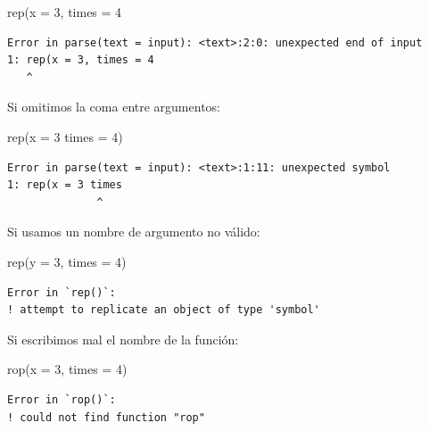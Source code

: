 \documentclass[
  spanish,
  letterpaper,
  DIV=11,
  numbers=noendperiod]{scrreprt}
\newenvironment{Shaded}{\begin{snugshade}}{\end{snugshade}}
\newcommand{\AttributeTok}[1]{\textcolor[rgb]{0.40,0.45,0.13}{#1}}
\newcommand{\DecValTok}[1]{\textcolor[rgb]{0.68,0.00,0.00}{#1}}
\newcommand{\FunctionTok}[1]{\textcolor[rgb]{0.28,0.35,0.67}{#1}}
\newcommand{\NormalTok}[1]{\textcolor[rgb]{0.00,0.23,0.31}{#1}}
\begin{document}
\begin{Shaded}
\begin{Highlighting}[]
\FunctionTok{rep}\NormalTok{(}\AttributeTok{x =} \DecValTok{3}\NormalTok{, }\AttributeTok{times =} \DecValTok{4}
\end{Highlighting}
\end{Shaded}

\begin{verbatim}
Error in parse(text = input): <text>:2:0: unexpected end of input
1: rep(x = 3, times = 4
   ^
\end{verbatim}

Si omitimos la coma entre argumentos:

\begin{Shaded}
\begin{Highlighting}[]
\FunctionTok{rep}\NormalTok{(}\AttributeTok{x =} \DecValTok{3} \AttributeTok{times =} \DecValTok{4}\NormalTok{)}
\end{Highlighting}
\end{Shaded}

\begin{verbatim}
Error in parse(text = input): <text>:1:11: unexpected symbol
1: rep(x = 3 times
              ^
\end{verbatim}

Si usamos un nombre de argumento no válido:

\begin{Shaded}
\begin{Highlighting}[]
\FunctionTok{rep}\NormalTok{(}\AttributeTok{y =} \DecValTok{3}\NormalTok{, }\AttributeTok{times =} \DecValTok{4}\NormalTok{)}
\end{Highlighting}
\end{Shaded}

\begin{verbatim}
Error in `rep()`:
! attempt to replicate an object of type 'symbol'
\end{verbatim}

Si escribimos mal el nombre de la función:

\begin{Shaded}
\begin{Highlighting}[]
\FunctionTok{rop}\NormalTok{(}\AttributeTok{x =} \DecValTok{3}\NormalTok{, }\AttributeTok{times =} \DecValTok{4}\NormalTok{)}
\end{Highlighting}
\end{Shaded}

\begin{verbatim}
Error in `rop()`:
! could not find function "rop"
\end{verbatim}
\end{document}
